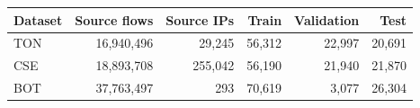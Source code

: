 \begin{tabular}{lrrrrr}
\toprule
Dataset & Source flows & Source IPs & Train & Validation & Test \\
\midrule
TON & 16,940,496 & 29,245 & 56,312 & 22,997 & 20,691 \\
CSE & 18,893,708 & 255,042 & 56,190 & 21,940 & 21,870 \\
BOT & 37,763,497 & 293 & 70,619 & 3,077 & 26,304 \\
\bottomrule
\end{tabular}
